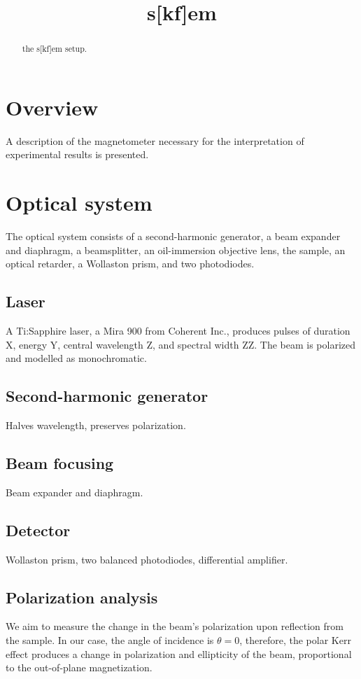 \documentclass{article}
\title{s[kf]em}
\begin{document}
\maketitle
\begin{abstract}
the s[kf]em setup.
\end{abstract}
\section{Overview}
A description of the magnetometer necessary for the interpretation of experimental results is presented.\cite{SKEM_Tamaru, SKEM_Back}
\section{Optical system}
The optical system consists of a second-harmonic generator, a beam expander and diaphragm, a beamsplitter, an oil-immersion objective lens, the sample, an optical retarder, a Wollaston prism, and two photodiodes.

\subsection{Laser}
A Ti:Sapphire laser, a Mira 900 from Coherent Inc., produces pulses of duration X, energy Y, central wavelength Z, and spectral width ZZ. The beam is polarized and modelled as monochromatic.

\subsection{Second-harmonic generator}
Halves wavelength, preserves polarization.

\subsection{Beam focusing}
Beam expander and diaphragm.

\subsection{Detector}
Wollaston prism, two balanced photodiodes, differential amplifier.

\subsection{Polarization analysis}
We aim to measure the change in the beam's polarization upon reflection from the sample. In our case, the angle of incidence is $\theta = 0$, therefore, the polar Kerr effect produces a change in polarization and ellipticity of the beam, proportional to the out-of-plane magnetization.
\end{document}
